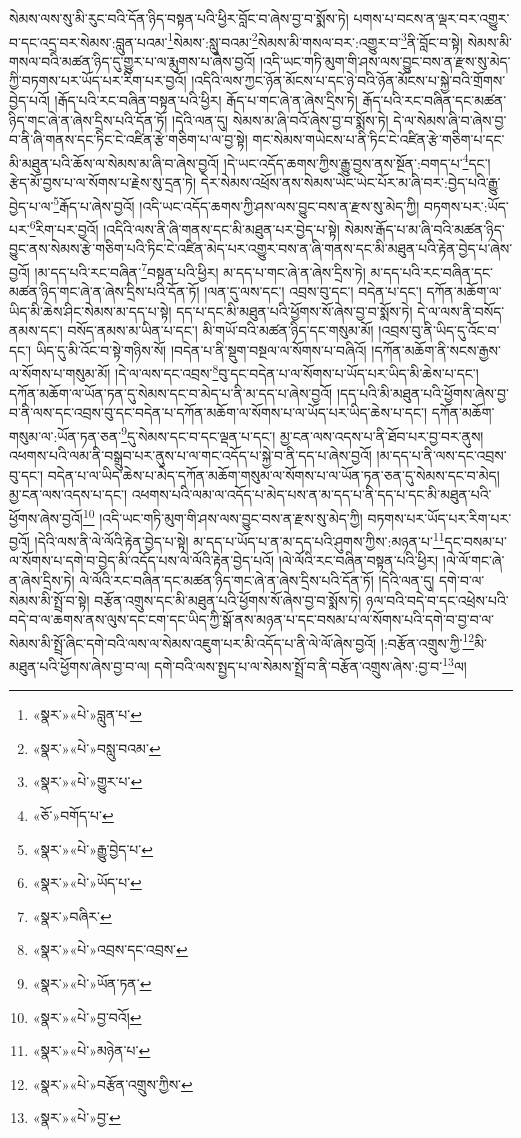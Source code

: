 སེམས་ལས་སུ་མི་རུང་བའི་དོན་ཉིད་བསྟན་པའི་ཕྱིར་བློང་བ་ཞེས་བྱ་བ་སྨོས་ཏེ། པགས་པ་བངས་ན་ལྡར་བར་འགྱུར་བ་དང་འདྲ་བར་སེམས་:བླུན་པའམ་\footnote{«སྣར་»«པེ་»བླུན་པ་}སེམས་:སླུ་བའམ་\footnote{«སྣར་»«པེ་»བསླུ་བའམ་}སེམས་མི་གསལ་བར་:འགྱུར་བ་\footnote{«སྣར་»«པེ་»གྱུར་པ་}ནི་བློང་བ་སྟེ། སེམས་མི་གསལ་བའི་མཚན་ཉིད་དུ་གྱུར་པ་ལ་རྨུགས་པ་ཞེས་བྱའོ། །འདི་ཡང་གཏི་མུག་གི་ཤས་ལས་བྱུང་བས་ན་རྫས་སུ་མེད་ཀྱི་བཏགས་པར་ཡོད་པར་རིག་པར་བྱའོ། །འདིའི་ལས་ཀྱང་ཉོན་མོངས་པ་དང་ཉེ་བའི་ཉོན་མོངས་པ་སྐྱེ་བའི་གྲོགས་བྱེད་པའོ། །རྒོད་པའི་རང་བཞིན་བསྟན་པའི་ཕྱིར། རྒོད་པ་གང་ཞེ་ན་ཞེས་དྲིས་ཏེ། རྒོད་པའི་རང་བཞིན་དང་མཚན་ཉིད་གང་ཞེ་ན་ཞེས་དྲིས་པའི་དོན་ཏོ། །དེའི་ལན་དུ། སེམས་མ་ཞི་བའོ་ཞེས་བྱ་བ་སྨོས་ཏེ། དེ་ལ་སེམས་ཞི་བ་ཞེས་བྱ་བ་ནི་ཞི་གནས་དང་ཏིང་ངེ་འཛིན་རྩེ་གཅིག་པ་ལ་བྱ་སྟེ། གང་སེམས་གཡེངས་པ་ནི་ཏིང་ངེ་འཛིན་རྩེ་གཅིག་པ་དང་མི་མཐུན་པའི་ཆོས་ལ་སེམས་མ་ཞི་བ་ཞེས་བྱའོ། །དེ་ཡང་འདོད་ཆགས་ཀྱིས་རྒྱུ་བྱས་ནས་སྔོན་:བགད་པ་\footnote{«ཅོ་»བགོད་པ་}དང་། རྩེད་མོ་བྱས་པ་ལ་སོགས་པ་རྗེས་སུ་དྲན་ཏེ། དེར་སེམས་འཕྲོས་ནས་སེམས་ཡེང་ཡེང་པོར་མ་ཞི་བར་:བྱེད་པའི་རྒྱུ་བྱེད་པ་ལ་\footnote{«སྣར་»«པེ་»རྒྱུ་བྱེད་པ་}རྒོད་པ་ཞེས་བྱའོ། །འདི་ཡང་འདོད་ཆགས་ཀྱི་ཤས་ལས་བྱུང་བས་ན་རྫས་སུ་མེད་ཀྱི། བཏགས་པར་:ཡོད་པར་\footnote{«སྣར་»«པེ་»ཡོད་པ་}རིག་པར་བྱའོ། །འདིའི་ལས་ནི་ཞི་གནས་དང་མི་མཐུན་པར་བྱེད་པ་སྟེ། སེམས་རྒོད་པ་མ་ཞི་བའི་མཚན་ཉིད་བྱུང་ནས་སེམས་རྩེ་གཅིག་པའི་ཏིང་ངེ་འཛིན་མེད་པར་འགྱུར་བས་ན་ཞི་གནས་དང་མི་མཐུན་པའི་རྟེན་བྱེད་པ་ཞེས་བྱའོ། །མ་དད་པའི་རང་བཞིན་\footnote{«སྣར་»བཞིར་}བསྟན་པའི་ཕྱིར། མ་དད་པ་གང་ཞེ་ན་ཞེས་དྲིས་ཏེ། མ་དད་པའི་རང་བཞིན་དང་མཚན་ཉིད་གང་ཞེ་ན་ཞེས་དྲིས་པའི་དོན་ཏོ། །ལན་དུ་ལས་དང་། འབྲས་བུ་དང་། བདེན་པ་དང་། དཀོན་མཆོག་ལ་ཡིད་མི་ཆེས་ཤིང་སེམས་མ་དད་པ་སྟེ། དད་པ་དང་མི་མཐུན་པའི་ཕྱོགས་སོ་ཞེས་བྱ་བ་སྨོས་ཏེ། དེ་ལ་ལས་ནི་བསོད་ནམས་དང་། བསོད་ནམས་མ་ཡིན་པ་དང་། མི་གཡོ་བའི་མཚན་ཉིད་དང་གསུམ་མོ། །འབྲས་བུ་ནི་ཡིད་དུ་འོང་བ་དང་། ཡིད་དུ་མི་འོང་བ་སྟེ་གཉིས་སོ། །བདེན་པ་ནི་སྡུག་བསྔལ་ལ་སོགས་པ་བཞིའོ། །དཀོན་མཆོག་ནི་སངས་རྒྱས་ལ་སོགས་པ་གསུམ་མོ། །དེ་ལ་ལས་དང་འབྲས་\footnote{«སྣར་»«པེ་»འབྲས་དང་འབྲས་}བུ་དང་བདེན་པ་ལ་སོགས་པ་ཡོད་པར་ཡིད་མི་ཆེས་པ་དང་། དཀོན་མཆོག་ལ་ཡོན་ཏན་དུ་སེམས་དང་བ་མེད་པ་ནི་མ་དད་པ་ཞེས་བྱའོ། །དད་པའི་མི་མཐུན་པའི་ཕྱོགས་ཞེས་བྱ་བ་ནི་ལས་དང་འབྲས་བུ་དང་བདེན་པ་དཀོན་མཆོག་ལ་སོགས་པ་ལ་ཡོད་པར་ཡིད་ཆེས་པ་དང་། དཀོན་མཆོག་གསུམ་ལ་:ཡོན་ཏན་ཅན་\footnote{«སྣར་»«པེ་»ཡོན་ཏན་}དུ་སེམས་དང་བ་དང་ལྡན་པ་དང་། མྱ་ངན་ལས་འདས་པ་ནི་ཐོབ་པར་བྱ་བར་ནུས། འཕགས་པའི་ལམ་ནི་བསྒྲུབ་པར་ནུས་པ་ལ་གང་འདོད་པ་སྐྱེ་བ་ནི་དད་པ་ཞེས་བྱའོ། །མ་དད་པ་ནི་ལས་དང་འབྲས་བུ་དང་། བདེན་པ་ལ་ཡིད་ཆེས་པ་མེད་དཀོན་མཆོག་གསུམ་ལ་སོགས་པ་ལ་ཡོན་ཏན་ཅན་དུ་སེམས་དང་བ་མེད། མྱ་ངན་ལས་འདས་པ་དང་། འཕགས་པའི་ལམ་ལ་འདོད་པ་མེད་པས་ན་མ་དད་པ་ནི་དད་པ་དང་མི་མཐུན་པའི་ཕྱོགས་ཞེས་བྱའོ།\footnote{«སྣར་»«པེ་»བྱ་བའོ།} །འདི་ཡང་གཏི་མུག་གི་ཤས་ལས་བྱུང་བས་ན་རྫས་སུ་མེད་ཀྱི། བཏགས་པར་ཡོད་པར་རིག་པར་བྱའོ། །དེའི་ལས་ནི་ལེ་ལོའི་རྟེན་བྱེད་པ་སྟེ། མ་དད་པ་ཡོད་པ་ན་མ་དད་པའི་ཤུགས་ཀྱིས་:མཉན་པ་\footnote{«སྣར་»«པེ་»མཉེན་པ་}དང་བསམ་པ་ལ་སོགས་པ་དགེ་བ་བྱེད་མི་འདོད་པས་ལེ་ལོའི་རྟེན་བྱེད་པའོ། །ལེ་ལོའི་རང་བཞིན་བསྟན་པའི་ཕྱིར། །ལེ་ལོ་གང་ཞེ་ན་ཞེས་དྲིས་ཏེ། ལེ་ལོའི་རང་བཞིན་དང་མཚན་ཉིད་གང་ཞེ་ན་ཞེས་དྲིས་པའི་དོན་ཏོ། །དེའི་ལན་དུ། དགེ་བ་ལ་སེམས་མི་སྤྲོ་བ་སྟེ། བརྩོན་འགྲུས་དང་མི་མཐུན་པའི་ཕྱོགས་སོ་ཞེས་བྱ་བ་སྨོས་ཏེ། ཉལ་བའི་བདེ་བ་དང་འཕྲེས་པའི་བདེ་བ་ལ་ཆགས་ནས་ལུས་དང་ངག་དང་ཡིད་ཀྱི་སྒོ་ནས་མཉན་པ་དང་བསམ་པ་ལ་སོགས་པའི་དགེ་བ་བྱ་བ་ལ་སེམས་མི་སྤྲོ་ཞིང་དགེ་བའི་ལས་ལ་སེམས་འཇུག་པར་མི་འདོད་པ་ནི་ལེ་ལོ་ཞེས་བྱའོ། །:བརྩོན་འགྲུས་ཀྱི་\footnote{«སྣར་»«པེ་»བརྩོན་འགྲུས་ཀྱིས་}མི་མཐུན་པའི་ཕྱོགས་ཞེས་བྱ་བ་ལ། དགེ་བའི་ལས་སྤྱད་པ་ལ་སེམས་སྤྲོ་བ་ནི་བརྩོན་འགྲུས་ཞེས་:བྱ་བ་\footnote{«སྣར་»«པེ་»བྱ་}ལ། 